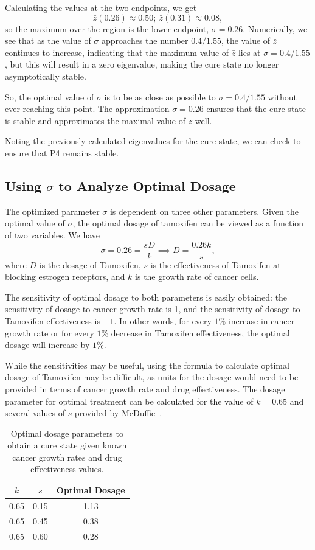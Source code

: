 \documentclass[12pt]{article}
\begin{document}
Calculating the values at the two endpoints, we get 
\[\bar{z}(0.26) \approx 0.50 ;\ \bar{z}(0.31) \approx 0.08,\]
so the maximum over the region is the lower endpoint, \(\sigma = 0.26\). Numerically, we see that as the value of \(\sigma\) approaches the number \(0.4/1.55\), the value of \(\bar{z}\) continues to increase, indicating that the maximum value of \(\bar{z}\) lies at \(\sigma = 0.4/1.55\), but this will result in a zero eigenvalue, making the cure state no longer asymptotically stable.

So, the optimal value of \(\sigma\) is to be as close as possible to \(\sigma = 0.4/1.55\) without ever reaching this point. The approximation \(\sigma = 0.26\) ensures that the cure state is stable and approximates the maximal value of \(\bar{z}\) well.

Noting the previously calculated eigenvalues for the cure state, we can check to ensure that P4 remains stable.

\subsection{Using \(\sigma\) to Analyze Optimal Dosage}
\indent\indent The optimized parameter \(\sigma\) is dependent on three other parameters. Given the optimal value of \(\sigma\), the optimal dosage of tamoxifen can be viewed as a function of two variables. We have
\[\sigma = 0.26 = \frac{sD}{k} \implies D = \frac{0.26k}{s},\]
where \(D\) is the dosage of Tamoxifen, \(s\) is the effectiveness of Tamoxifen at blocking estrogen receptors, and \(k\) is the growth rate of cancer cells.

The sensitivity of optimal dosage to both parameters is easily obtained: the sensitivity of dosage to cancer growth rate is 1, and the sensitivity of dosage to Tamoxifen effectiveness is \(-1\). In other words, for every \(1\%\) increase in cancer growth rate or for every \(1\%\) decrease in Tamoxifen effectiveness, the optimal dosage will increase by \(1\%\). 

While the sensitivities may be useful, using the formula to calculate optimal dosage of Tamoxifen may be difficult, as units for the dosage would need to be provided in terms of cancer growth rate and drug effectiveness. The dosage parameter for optimal treatment can be calculated for the value of \(k=0.65\) and several values of \(s\) provided by McDuffie~\cite{mcduffie}.

\begin{table}[h!]
    \centering
    \begin{tabular}{|c|c|c|}
    \hline
         \(k\) & \(s\) & Optimal Dosage  \\
         \hline
         \hline
         0.65 & 0.15 & 1.13 \\
         0.65 & 0.45 & 0.38 \\
         0.65 & 0.60 & 0.28\\
         \hline
    \end{tabular}
    \caption{Optimal dosage parameters to obtain a cure state given known cancer growth rates and drug effectiveness values.}
    \label{t:optimaldosage}
\end{table}
\end{document}
